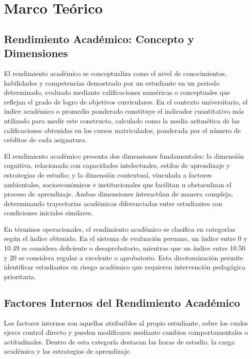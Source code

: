\documentclass[
  stu,
  floatsintext,
  longtable,
  a4paper,
  nolmodern,
  notxfonts,
  notimes,
  12pt,
  colorlinks=true,linkcolor=blue,citecolor=blue,urlcolor=blue]{apa7}
\begin{document}
\section{Marco Teórico}\label{marco-teuxf3rico}

\subsection{Rendimiento Académico: Concepto y
Dimensiones}\label{rendimiento-acaduxe9mico-concepto-y-dimensiones}

El rendimiento académico se conceptualiza como el nivel de
conocimientos, habilidades y competencias demostrado por un estudiante
en un periodo determinado, evaluado mediante calificaciones numéricas o
conceptuales que reflejan el grado de logro de objetivos curriculares.
En el contexto universitario, el índice académico o promedio ponderado
constituye el indicador cuantitativo más utilizado para medir este
constructo, calculado como la media aritmética de las calificaciones
obtenidas en los cursos matriculados, ponderada por el número de
créditos de cada asignatura.

El rendimiento académico presenta dos dimensiones fundamentales: la
dimensión cognitiva, relacionada con capacidades intelectuales, estilos
de aprendizaje y estrategias de estudio; y la dimensión contextual,
vinculada a factores ambientales, socioeconómicos e institucionales que
facilitan u obstaculizan el proceso de aprendizaje. Ambas dimensiones
interactúan de manera compleja, determinando trayectorias académicas
diferenciadas entre estudiantes con condiciones iniciales similares.

En términos operacionales, el rendimiento académico se clasifica en
categorías según el índice obtenido. En el sistema de evaluación
peruano, un índice entre 0 y 10.49 se considera deficiente o
desaprobatorio, mientras que un índice entre 10.50 y 20 se considera
regular a excelente o aprobatorio. Esta dicotomización permite
identificar estudiantes en riesgo académico que requieren intervención
pedagógica prioritaria.

\subsection{Factores Internos del Rendimiento
Académico}\label{factores-internos-del-rendimiento-acaduxe9mico}

Los factores internos son aquellos atribuibles al propio estudiante,
sobre los cuales ejerce control directo y pueden modificarse mediante
cambios comportamentales o actitudinales. Dentro de esta categoría
destacan las horas de estudio, la carga académica y las estrategias de
aprendizaje.
\end{document}
